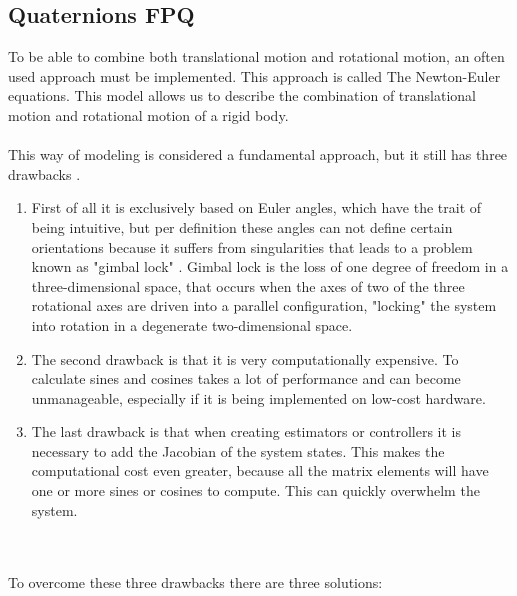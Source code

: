 \subsection{Quaternions FPQ}
To be able to combine both translational motion and rotational motion, an often used approach must be implemented. This approach is called The Newton-Euler equations. This model allows us to describe the combination of translational motion and rotational motion of a rigid body. 
\\\\
This way of modeling is considered a fundamental approach, but it still has three drawbacks \cite{lule}. 
\begin{enumerate}
    \item First of all it is exclusively based on Euler angles, which have the trait of being intuitive, but per definition these angles can not define certain orientations because it suffers from singularities that leads to a problem known as "gimbal lock" \cite{gimbal}. Gimbal lock is the loss of one degree of freedom in a three-dimensional space, that occurs when the axes of two of the three rotational axes are driven into a parallel configuration, "locking" the system into rotation in a degenerate two-dimensional space. 
    \item The second drawback is that it is very computationally expensive. To calculate sines and cosines takes a lot of performance and can become unmanageable, especially if it is being implemented on low-cost hardware. 
    \item The last drawback is that when creating estimators or controllers it is necessary to add the Jacobian of the system states. This makes the computational cost even greater, because all the matrix elements will have one or more sines or cosines to compute. This can quickly overwhelm the system. 
\end{enumerate}
\\\\
To overcome these three drawbacks there are three solutions: 
